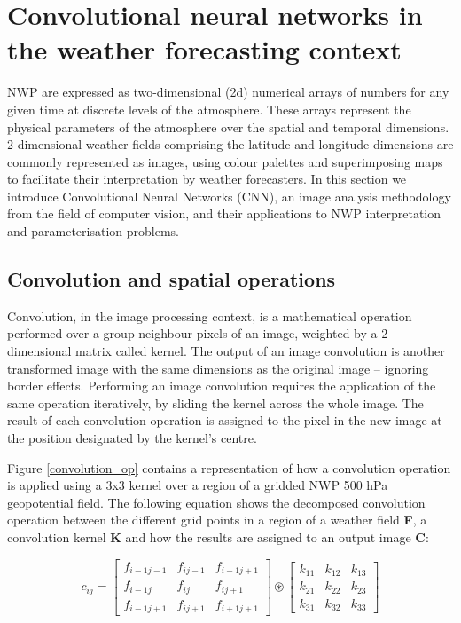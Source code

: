 \documentclass[twocol]{ametsoc}
\begin{document}
\section{Convolutional neural networks in the weather forecasting context}

NWP are expressed as two-dimensional (2d) numerical arrays of numbers for any given time at discrete levels of the atmosphere. These arrays represent the physical parameters of the atmosphere over the spatial and temporal dimensions. 2-dimensional weather fields comprising the latitude and longitude dimensions are commonly represented as images, using colour palettes and superimposing maps to facilitate their interpretation by weather forecasters. In this section we introduce Convolutional Neural Networks (CNN), an image analysis methodology from the field of computer vision, and their applications to NWP interpretation and parameterisation problems.

\subsection{Convolution and spatial operations}
Convolution, in the image processing context, is a mathematical operation performed over a group neighbour pixels of an image, weighted by a 2-dimensional matrix called kernel. The output of an image convolution is another transformed image with the same dimensions as the original image -- ignoring border effects. Performing an image convolution requires the application of the same operation iteratively, by sliding the kernel across the whole image. The result of each convolution operation is assigned to the pixel in the new image at the position designated by the kernel's centre.

Figure \ref{convolution_op} contains a representation of how a convolution operation is applied using a 3x3 kernel over a region of a gridded NWP 500 hPa geopotential field. The following equation shows the decomposed convolution operation between the different grid points in a region of a weather field \textbf{F}, a convolution kernel \textbf{K} and how the results are assigned to an output image \textbf{C}: 

\begin{equation}
c_{ij} = 
\begin{bmatrix}
    f_{i-1j-1} & f_{ij-1} & f_{i-1j+1} \\
    f_{i-1j} & f_{ij} & f_{ij+1}\\
    f_{i-1j+1} & f_{ij+1} & f_{i+1j+1}
\end{bmatrix}
\circledast
\begin{bmatrix}
    k_{11} & k_{12} & k_{13}\\
    k_{21} & k_{22} & k_{23}\\
    k_{31} & k_{32} & k_{33}
\end{bmatrix}


\end{equation}
\end{document}
